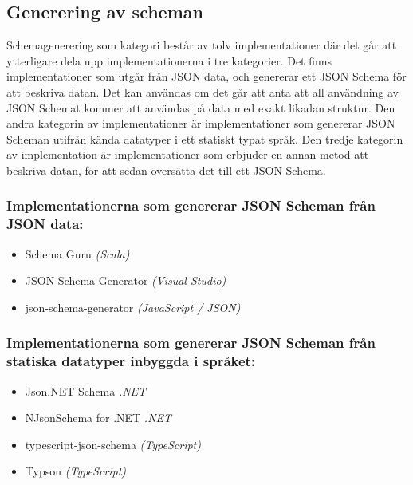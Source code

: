 \subsection{Generering av scheman}
\label{sec:teori:schema-användningsområden:generering}
Schemagenerering som kategori består av tolv implementationer där det går att ytterligare dela upp implementationerna i tre kategorier. Det finns implementationer som utgår från JSON data, och genererar ett JSON Schema för att beskriva datan. Det kan användas om det går att anta att all användning av JSON Schemat kommer att användas på data med exakt likadan struktur. Den andra kategorin av implementationer är implementationer som genererar JSON Scheman utifrån kända datatyper i ett statiskt typat språk. Den tredje kategorin av implementation är implementationer som erbjuder en annan metod att beskriva datan, för att sedan översätta det till ett JSON Schema. \cite{TheJSONSchemaorganisation}

\subsubsection{Implementationerna som genererar JSON Scheman från JSON data:}
\begin{itemize}
	\item Schema Guru \textit{(Scala)} \cite{Snowplow}
	\item JSON Schema Generator \textit{(Visual Studio)} \cite{MadsKristensen}
	\item json-schema-generator \textit{(JavaScript / JSON)} \cite{Romanovich}
\end{itemize}

\subsubsection{Implementationerna som genererar JSON Scheman från statiska datatyper inbyggda i språket:}
\begin{itemize}
	\item Json.NET Schema \textit{.NET} \cite{Newtonsoft}
	\item NJsonSchema for .NET \textit{.NET} \cite{Suter}
	\item typescript-json-schema \textit{(TypeScript)} \cite{El-Dardiry}
	\item Typson \textit{(TypeScript)} \cite{Bovet}
\end{itemize}

